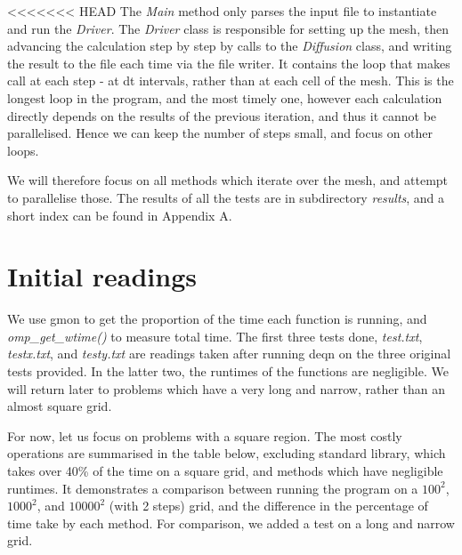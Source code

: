 \documentclass[11pt,journal]{IEEEtran}
\begin{document}
<<<<<<< HEAD
	The \emph{Main} method only parses the input file to instantiate and run the \emph{Driver}. The \emph{Driver} class is responsible for setting up the mesh, then advancing the calculation step by step by calls to the \emph{Diffusion} class, and writing the result to the file each time via the file writer. It contains the loop that makes call at each step - at dt intervals, rather than at each cell of the mesh. This is the longest loop in the program, and the most timely one, however each calculation directly depends on the results of the previous iteration, and thus it cannot be parallelised. Hence we can keep the number of steps small, and focus on other loops.
	
	We will therefore focus on all methods which iterate over the mesh, and attempt to parallelise those. The results of all the tests are in subdirectory \emph{results}, and a short index can be found in Appendix A.
	
	\section{Initial readings}
	We use gmon to get the proportion of the time each function is running, and \emph{omp\_get\_wtime()} to measure total time. The first three tests done, \emph{test.txt}, \emph{testx.txt}, and \emph{testy.txt} are readings taken after running deqn on the three original tests provided. In the latter two, the runtimes of the functions are negligible. We will return later to problems which have a very long and narrow, rather than an almost square grid. 
	
	For now, let us focus on problems with a square region. The most costly operations are summarised in the table below, excluding standard library, which takes over 40\% of the time on a square grid, and methods which have negligible runtimes. It demonstrates a comparison between running the program on a $100^2$, $1000^2$, and $10000^2$ (with 2 steps) grid, and the difference in the percentage of time take by each method. For comparison, we added a test on a long and narrow grid.
	
\end{document}
